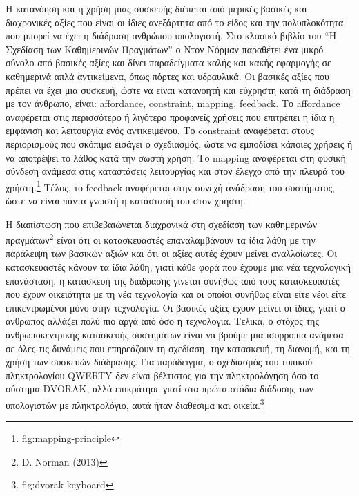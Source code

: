 \documentclass[
]{article}
\begin{document}
Η κατανόηση και η χρήση μιας συσκευής διέπεται από μερικές βασικές και
διαχρονικές αξίες που είναι οι ίδιες ανεξάρτητα από το είδος και την
πολυπλοκότητα που μπορεί να έχει η διάδραση ανθρώπου υπολογιστή. Στο
κλασικό βιβλίο του ``Η Σχεδίαση των Καθημερινών Πραγμάτων'' ο Ντον
Νόρμαν παραθέτει ένα μικρό σύνολο από βασικές αξίες και δίνει
παραδείγματα καλής και κακής εφαρμογής σε καθημερινά απλά αντικείμενα,
όπως πόρτες και υδραυλικά. Οι βασικές αξίες που πρέπει να έχει μια
συσκευή, ώστε να είναι κατανοητή και εύχρηστη κατά τη διάδραση με τον
άνθρωπο, είναι: affordance, constraint, mapping, feedback. Το affordance
αναφέρεται στις περισσότερο ή λιγότερο προφανείς χρήσεις που επιτρέπει η
ίδια η εμφάνιση και λειτουργία ενός αντικειμένου. Το constraint
αναφέρεται στους περιορισμούς που σκόπιμα εισάγει ο σχεδιασμός, ώστε να
εμποδίσει κάποιες χρήσεις ή να αποτρέψει το λάθος κατά την σωστή χρήση.
Το mapping αναφέρεται στη φυσική σύνδεση ανάμεσα στις καταστάσεις
λειτουργίας και στον έλεγχο από την πλευρά του χρήστη.\footnote{fig:mapping-principle}
Τέλος, το feedback αναφέρεται στην συνεχή ανάδραση του συστήματος, ώστε
να είναι πάντα γνωστή η κατάστασή του στον χρήστη.

Η διαπίστωση που επιβεβαιώνεται διαχρονικά στη σχεδίαση των καθημερινών
πραγμάτων\footnote{D. Norman (2013)} είναι ότι οι κατασκευαστές
επαναλαμβάνουν τα ίδια λάθη με την παράλειψη των βασικών αξιών και ότι
οι αξίες αυτές έχουν μείνει αναλλοίωτες. Οι κατασκευαστές κάνουν τα ίδια
λάθη, γιατί κάθε φορά που έχουμε μια νέα τεχνολογική επανάσταση, η
κατασκευή της διάδρασης γίνεται συνήθως από τους κατασκευαστές που έχουν
οικειότητα με τη νέα τεχνολογία και οι οποίοι συνήθως είναι είτε νέοι
είτε επικεντρωμένοι μόνο στην τεχνολογία. Οι βασικές αξίες έχουν μείνει
οι ίδιες, γιατί ο άνθρωπος αλλάζει πολύ πιο αργά από όσο η τεχνολογία.
Τελικά, ο στόχος της ανθρωποκεντρικής κατασκευής συστημάτων είναι να
βρούμε μια ισορροπία ανάμεσα σε όλες τις δυνάμεις που επηρεάζουν τη
σχεδίαση, την κατασκευή, τη διανομή, και τη χρήση των συσκευών
διάδρασης. Για παράδειγμα, ο σχεδιασμός του τυπικού πληκτρολογίου QWERTY
δεν είναι βέλτιστος για την πληκτρολόγηση όσο το σύστημα DVORAK, αλλά
επικράτησε γιατί στα πρώτα στάδια διάδοσης των υπολογιστών με
πληκτρολόγιο, αυτά ήταν διαθέσιμα και οικεία.\footnote{fig:dvorak-keyboard}
\end{document}
